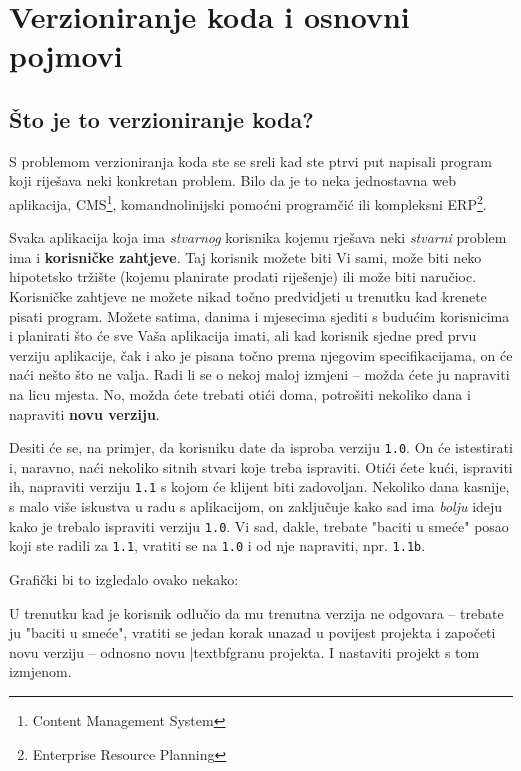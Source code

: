 \chapter*{Verzioniranje koda i osnovni pojmovi}

\section*{Što je to verzioniranje koda?}

S problemom verzioniranja koda ste se sreli kad ste ptrvi put napisali program koji riješava neki konkretan problem. 
Bilo da je to neka jednostavna web aplikacija, CMS\footnote{Content Management System}, komandnolinijski pomoćni programčić ili kompleksni ERP\footnote{Enterprise Resource Planning}.

Svaka aplikacija koja ima \textit{stvarnog} korisnika kojemu rješava neki \textit{stvarni} problem ima i \textbf{korisničke zahtjeve}.
Taj korisnik možete biti Vi sami, može biti neko hipotetsko tržište (kojemu planirate prodati riješenje) ili može biti naručioc.
Korisničke zahtjeve ne možete nikad točno predvidjeti u trenutku kad krenete pisati program.
Možete satima, danima i mjesecima sjediti s budućim korisnicima i planirati što će sve Vaša aplikacija imati, ali kad korisnik sjedne pred prvu verziju aplikacije, čak i ako je pisana točno prema njegovim specifikacijama, on će naći nešto što ne valja. 
Radi li se o nekoj maloj izmjeni -- možda ćete ju napraviti na licu mjesta. No, možda ćete trebati otići doma, potrošiti nekoliko dana i napraviti \textbf{novu verziju}.

Desiti će se, na primjer, da korisniku date da isproba verziju \texttt{1.0}.
On će istestirati i, naravno, naći nekoliko sitnih stvari koje treba ispraviti.
Otići ćete kući, ispraviti ih, napraviti verziju \texttt{1.1} s kojom će klijent biti zadovoljan.
Nekoliko dana kasnije, s malo više iskustva u radu s aplikacijom, on zaključuje kako sad ima \textit{bolju} ideju kako je trebalo ispraviti verziju \texttt{1.0}.
Vi sad, dakle, trebate "baciti u smeće" posao koji ste radili za \texttt{1.1}, vratiti se na \texttt{1.0} i od nje napraviti, npr. \texttt{1.1b}.

Grafički bi to izgledalo ovako nekako:



U trenutku kad je korisnik odlučio da mu trenutna verzija ne odgovara -- trebate ju "baciti u smeće", vratiti se jedan korak unazad u povijest projekta i započeti novu verziju -- odnosno novu |textbf{granu projekta}. I nastaviti projekt s tom izmjenom.

